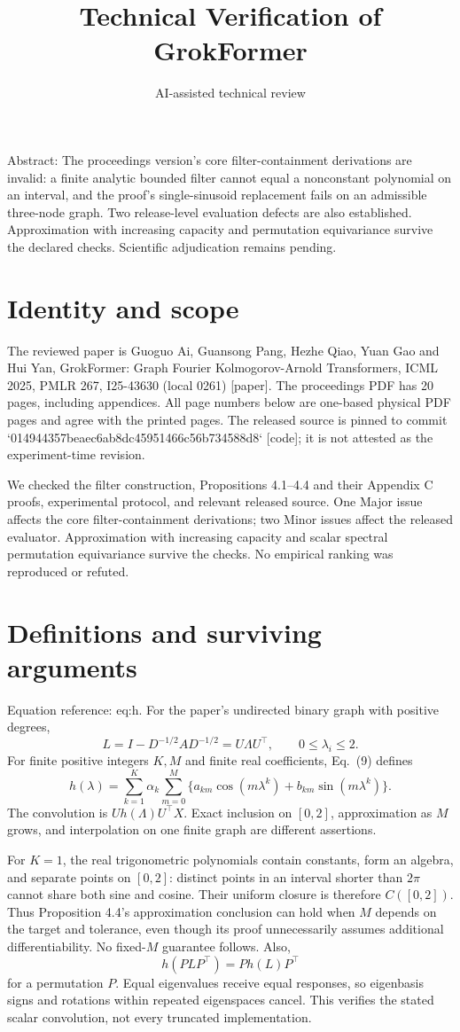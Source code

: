 \documentclass[10pt]{article}
\title{Technical Verification of GrokFormer}
\author{AI-assisted technical review}
\date{}
\begin{document}
\maketitle
Abstract: The proceedings version’s core filter-containment derivations are invalid: a finite analytic bounded filter cannot equal a nonconstant polynomial on an interval, and the proof’s single-sinusoid replacement fails on an admissible three-node graph. Two release-level evaluation defects are also established. Approximation with increasing capacity and permutation equivariance survive the declared checks. Scientific adjudication remains pending.\par
\section*{Identity and scope}
The reviewed paper is Guoguo Ai, Guansong Pang, Hezhe Qiao, Yuan Gao and Hui Yan, GrokFormer: Graph Fourier Kolmogorov-Arnold Transformers, ICML 2025, PMLR 267, I25-43630 (local 0261) [paper]. The proceedings PDF has 20 pages, including appendices. All page numbers below are one-based physical PDF pages and agree with the printed pages. The released source is pinned to commit `014944357beaec6ab8dc45951466c56b734588d8` [code]; it is not attested as the experiment-time revision.\par
We checked the filter construction, Propositions 4.1–4.4 and their Appendix C proofs, experimental protocol, and relevant released source. One Major issue affects the core filter-containment derivations; two Minor issues affect the released evaluator. Approximation with increasing capacity and scalar spectral permutation equivariance survive the checks. No empirical ranking was reproduced or refuted.\par
\section*{Definitions and surviving arguments}
Equation reference: eq:h. For the paper’s undirected binary graph with positive degrees, \[L=I-D^{-1/2}AD^{-1/2}=U\Lambda U^\top,\qquad 0\leq\lambda_i\leq2.\] For finite positive integers \(K,M\) and finite real coefficients, Eq. (9) defines \[
h(\lambda)=\sum_{k=1}^{K}\alpha_k\sum_{m=0}^{M}
\{a_{km}\cos(m\lambda^k)+b_{km}\sin(m\lambda^k)\}.\] The convolution is \(Uh(\Lambda)U^\top X\). Exact inclusion on \([0,2]\), approximation as \(M\) grows, and interpolation on one finite graph are different assertions.\par
For \(K=1\), the real trigonometric polynomials contain constants, form an algebra, and separate points on \([0,2]\): distinct points in an interval shorter than \(2\pi\) cannot share both sine and cosine. Their uniform closure is therefore \(C([0,2])\). Thus Proposition 4.4’s approximation conclusion can hold when \(M\) depends on the target and tolerance, even though its proof unnecessarily assumes additional differentiability. No fixed-\(M\) guarantee follows. Also, \[h(PLP^\top)=Ph(L)P^\top\] for a permutation \(P\). Equal eigenvalues receive equal responses, so eigenbasis signs and rotations within repeated eigenspaces cancel. This verifies the stated scalar convolution, not every truncated implementation.\par
\end{document}
